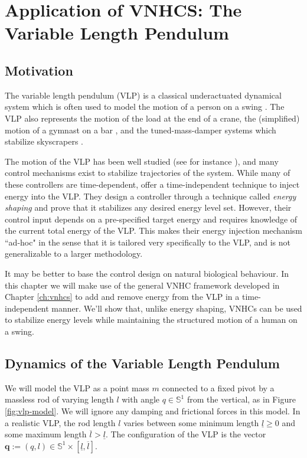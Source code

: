 
\chapter{Application of VNHCS: The Variable Length Pendulum}\label{sec:vlp}
\section{Motivation}
The variable length pendulum (VLP) is a classical underactuated dynamical system
which is often used to model the motion of a person on a swing
\cite{pumping_swing_standing_squatting,how_to_pump_a_swing}.
The VLP also represents the motion of the load at the end of a crane, 
the (simplified) motion of a gymnast on a bar
\cite{pendulum_length_giant_gymnastics}, and the tuned-mass-damper systems which
stabilize skyscrapers \cite{vlp_tuned_mass_damper}.

The motion of the VLP has been well studied (see for instance
\cite{dynamics_periodic_vlp}), and many control mechanisms exist
to stabilize trajectories of the system. While many of these controllers 
are time-dependent, \citet{vlp_energy_shaping}
offer a time-independent technique to inject energy into the VLP. 
They design a controller through a technique called \textit{energy shaping}
and prove that it stabilizes any desired energy level set.
However, their control input depends on a pre-specified target energy and requires
knowledge of the current total energy of the VLP.
This makes their energy injection mechanism ``ad-hoc" in the sense that it is
tailored very specifically to the VLP, and is not generalizable to a larger 
methodology.

It may be better to base the control design on natural biological behaviour.
In this chapter we will make use of the general VNHC framework developed in Chapter
\ref{ch:vnhcs} to add and remove energy from the VLP in a time-independent
manner.
We'll show that, unlike energy shaping, VNHCs can be used to stabilize energy
levels while maintaining the structured motion of a human on a swing.

\section{Dynamics of the Variable Length Pendulum}
We will model the VLP as a point mass \(m\)
connected to a fixed pivot by a massless rod of varying length \(l\) with angle 
\(q \in \mathbb{S}^1\) from the vertical, as in Figure
\ref{fig:vlp-model}. 
We will ignore any damping and frictional forces in this model.
In a realistic VLP, the rod length \(l\) varies between some minimum
length \(\underline{l} \geq 0\) and some maximum length 
\(\overline{l} > \underline{l}\). The configuration of the VLP is the vector
\(\mathbf{q} := (q,l) \in \mathbb{S}^1 \times [\underline{l},\overline{l}]\).

